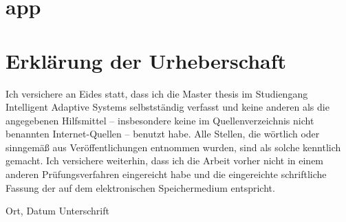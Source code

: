 \documentclass[12pt,final,twoside]{report}
\newcommand{\trtype}{Master thesis} %
\newcommand{\trcourseofstudies}{Intelligent Adaptive Systems} %
\theoremstyle{plain}
\theoremstyle{definition}
\theoremstyle{remark}
\begin{document}
\chapter{app}

\cleardoublepage


    
\cleardoublepage

\vspace{2cm}
\chapter*{Erkl\"arung der Urheberschaft}
Ich versichere an Eides statt, dass ich die \trtype{} im Studiengang \trcourseofstudies{} selbstst\"andig verfasst und keine anderen als die angegebenen Hilfsmittel -- insbesondere keine im Quellenverzeichnis nicht benannten Internet-Quellen -- benutzt habe. Alle Stellen, die w\"ortlich oder sinngem\"a{\ss} aus Ver\"offentlichungen entnommen wurden, sind als solche kenntlich gemacht. Ich versichere weiterhin, dass ich die Arbeit vorher nicht in einem anderen Pr\"ufungsverfahren eingereicht habe und die eingereichte schriftliche Fassung der auf dem elektronischen Speichermedium entspricht.


\vspace{4cm}
\noindent Ort, Datum \hfill Unterschrift

\newpage
\thispagestyle{empty}
\hspace{1cm}
\newpage
\end{document}
